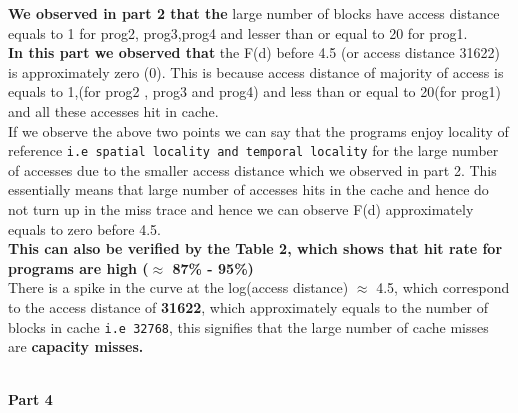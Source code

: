 \documentclass[12pt,oneside,reqno]{amsart}
\begin{document}
\textbf{We observed in part 2 that the} large number of blocks have access distance equals to 1 for prog2, prog3,prog4 and lesser than or equal to 20 for prog1.\\

\textbf{In this part we observed that} the F(d) before 4.5 (or access distance 31622) is approximately zero (0). This is because access distance of majority of access is equals to 1,(for prog2 , prog3 and prog4) and less than or equal to 20(for prog1) and all these accesses hit in cache.\\


    If we observe the above two points we can say that the programs enjoy locality of reference \texttt{i.e spatial locality and temporal locality} for the large number of accesses due to the smaller access distance which we observed in part 2. This essentially means that large number of accesses hits in the cache and hence do not turn up in the miss trace and hence we can observe F(d) approximately equals to zero before 4.5.\\


\textbf{This can also be verified by the Table 2, which shows that hit rate for programs are high ($\approx$ 87\% - 95\%)}\\


 There is a spike in the curve at the log(access distance) $\approx$ 4.5, which correspond to the access distance of \textbf{31622}, which approximately equals to the number of blocks in cache \texttt{i.e 32768}, this signifies that the large number of cache misses are \textbf{ capacity misses.}






\newpage
\begin{LARGE}
		\textbf{\\Part 4  }
	\end{LARGE}
\end{document}
